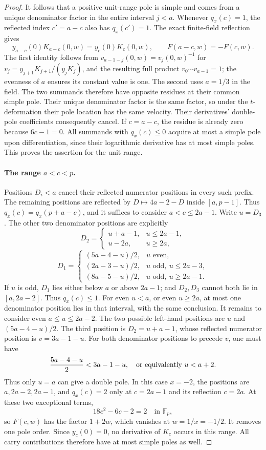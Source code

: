 \documentclass[11pt,letterpaper]{article}
\numberwithin{equation}{section}
\begin{document}
\begin{proof}
It follows that a positive unit-range pole is simple and comes from
a unique denominator factor in the entire interval $j<a$.
Whenever $q_x(c)=1$, the reflected index $c'=a-c$ also has
$q_x(c')=1$. The exact finite-field reflection gives
\[
 y_{a-c}(0)K_{a-c}(0,w)=y_c(0)K_c(0,w),\qquad
 F(a-c,w)=-F(c,w).
\]
The first identity follows from $v_{a-1-j}(0,w)=v_j(0,w)^{-1}$
for $v_j=y_{j+1}K_{j+1}/(y_jK_j)$, and the resulting full product
$v_0\cdots v_{a-1}=1$; the evenness of $a$ ensures its constant
value is one. The second uses $a=1/3$ in the field.
The two summands therefore have opposite residues at their common
simple pole. Their unique denominator factor is the same factor,
so under the $t$-deformation their pole location has the same
velocity. Their derivatives' double-pole coefficients consequently
cancel. If $c=a-c$, the residue is already zero because
$6c-1=0$. All summands with $q_x(c)\le0$ acquire at most a simple
pole upon differentiation, since their logarithmic derivative has
at most simple poles. This proves the assertion for the unit range.

\paragraph{The range $a<c<p$.}
Positions $D_i<a$ cancel their reflected numerator positions in
every such prefix. The remaining positions are reflected by
$D\mapsto4a-2-D$ inside $[a,p-1]$. Thus
$q_x(c)=q_x(p+a-c)$, and it suffices to consider $a<c\le2a-1$.
Write $u=D_3$. The other two denominator positions are explicitly
\[
 D_2=\begin{cases}u+a-1,&u\le2a-1,\\u-2a,&u\ge2a,\end{cases}
\]
\[
 D_1=\begin{cases}
 (5a-4-u)/2,&u\text{ even},\\
 (2a-3-u)/2,&u\text{ odd},\ u\le2a-3,\\
 (8a-5-u)/2,&u\text{ odd},\ u\ge2a-1.
 \end{cases}
\]
If $u$ is odd, $D_1$ lies either below $a$ or above $2a-1$;
and $D_2,D_3$ cannot both lie in $[a,2a-2]$. Thus $q_x(c)\le1$.
For even $u<a$, or even $u\ge2a$, at most one denominator position
lies in that interval, with the same conclusion.
It remains to consider even $a\le u\le2a-2$. The two possible
left-hand positions are $u$ and $(5a-4-u)/2$. The third position
is $D_2=u+a-1$, whose reflected numerator position is
$v=3a-1-u$. For both denominator positions to precede $v$, one must
have
\[
 \frac{5a-4-u}{2}<3a-1-u,\quad\hbox{or equivalently }u<a+2.
\]
Thus only $u=a$ can give a double pole. In this case $x=-2$, the
positions are $a,2a-2,2a-1$, and $q_x(c)=2$ only at
$c=2a-1$ and its reflection $c=2a$.
At these two exceptional terms,
\[
 18c^2-6c-2=2\quad\text{in }\mathbb F_p,
\]
so $F(c,w)$ has the factor $1+2w$, which vanishes at $w=1/x=-1/2$.
It removes one pole order. Since $y_c(0)=0$, no derivative of $K_c$
occurs in this range. All carry contributions therefore have at most
simple poles as well.


\end{proof}
\end{document}
